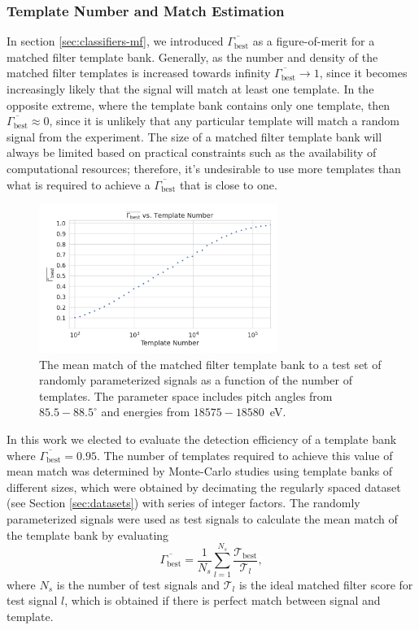 \subsubsection{Template Number and Match Estimation}
In section \ref{sec:classifiers-mf}, we introduced $\overline{\Gamma_\mathrm{best}}$ as a figure-of-merit for a matched filter template bank. Generally, as the number and density of the matched filter templates is increased towards infinity $\overline{\Gamma_\mathrm{best}}\rightarrow1$, since it becomes increasingly likely that the signal will match at least one template. In the opposite extreme, where the template bank contains only one template, then $\overline{\Gamma_\mathrm{best}}\approx0$, since it is unlikely that any particular template will match a random signal from the experiment. The size of a matched filter template bank will always be limited based on practical constraints such as the availability of computational resources; therefore, it's undesirable to use more templates than what is required to achieve a $\overline{\Gamma_\mathrm{best}}$ that is close to one. 

\begin{figure}[htbp]
    \centering
    \includegraphics[width=0.69\textwidth]{figs/Chapter-4/230915_mean_match_vs_templates.png}
    \caption{The mean match of the matched filter template bank to a test set of randomly parameterized signals as a function of the number of templates. The parameter space includes pitch angles from $85.5-88.5^\circ$ and energies from $18575-18580$~eV.}
    \label{fig:match_vs_template_number}
\end{figure}

In this work we elected to evaluate the detection efficiency of a template bank where $\overline{\Gamma_\mathrm{best}}=0.95$. The number of templates required to achieve this value of mean match was determined by Monte-Carlo studies using template banks of different sizes, which were obtained by decimating the regularly spaced dataset (see Section \ref{sec:datasets}) with series of integer factors. The randomly parameterized signals were used as test signals to calculate the mean match of the template bank by evaluating 
\begin{equation}
    \overline{\Gamma_\mathrm{best}}=\frac{1}{N_s}\sum_{l=1}^{N_s}{\frac{\mathcal{T}_\mathrm{best}}{\mathcal{T}_l}},
\end{equation}
where $N_s$ is the number of test signals and $\mathcal{T}_l$ is the ideal matched filter score for test signal $l$, which is obtained if there is perfect match between signal and template. 

